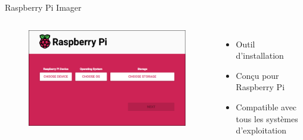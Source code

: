 \documentclass[aspectratio=169,xcolor=dvipsnames]{beamer}
\begin{document}
\begin{frame}{Raspberry Pi Imager}
    \begin{columns}[c] %

        \begin{figure}
            \includegraphics[width=1\textwidth]{1/rpi-imager-0.png}
        \end{figure}

        \begin{itemize}
            \item Outil d'installation
            \item Conçu pour Raspberry Pi
            \item Compatible avec tous les systèmes d'exploitation
        \end{itemize}

    \end{columns}
\end{frame}

\end{document}
